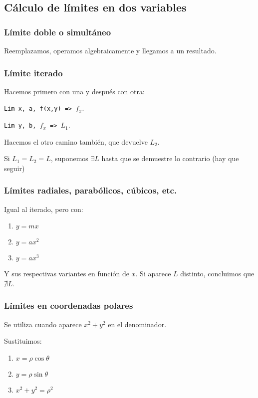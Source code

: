 \subsection{Cálculo de límites en dos variables}

\subsubsection{Límite doble o simultáneo}

Reemplazamos, operamos algebraicamente y llegamos a un resultado.

\subsubsection{Límite iterado}

Hacemos primero con una y después con otra:

\texttt{Lim x, a, f(x,y) => \(f_x\)}.

\texttt{Lim y, b, \(f_x\) => \(L_1\)}.

Hacemos el otro camino también,
que devuelve \(L_2\).

Si \(L_1 = L_2 = L\), suponemos \(\exists L\) hasta que se demuestre lo contrario (hay que seguir)

\subsubsection{Límites radiales, parabólicos, cúbicos, etc.}

Igual al iterado, pero con:

\begin{enumerate}
    \item \(y = mx\)
    \item \(y = ax^{2}\)
    \item \(y = ax^{3}\)
\end{enumerate}

Y sus respectivas variantes en función de \(x\).
Si aparece \(L\) distinto, concluimos que \(\nexists L\).

\subsubsection{Límites en coordenadas polares}


Se utiliza cuando aparece \(x^{2} + y^{2}\) en el denominador.

Sustituimos:
\begin{enumerate}
    \item \(x = \rho \cos\theta\)
    \item \(y = \rho \sin\theta\)
    \item \(x^{2} + y^{2} = \rho^{2}\)
\end{enumerate}

